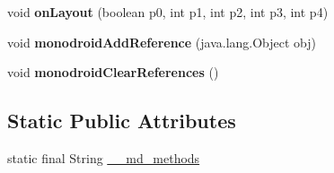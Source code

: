 \begin{DoxyCompactItemize}
\item 
\mbox{\label{classmd5b60ffeb829f638581ab2bb9b1a7f4f3f_1_1VisualElementRenderer__1_a8c7af843aeec04827cb3a3981ea1978d}} 
void {\bfseries on\+Layout} (boolean p0, int p1, int p2, int p3, int p4)
\item 
\mbox{\label{classmd5b60ffeb829f638581ab2bb9b1a7f4f3f_1_1VisualElementRenderer__1_a321b2967faff34b0f7971f55915f583e}} 
void {\bfseries monodroid\+Add\+Reference} (java.\+lang.\+Object obj)
\item 
\mbox{\label{classmd5b60ffeb829f638581ab2bb9b1a7f4f3f_1_1VisualElementRenderer__1_a4a1c180026d8eab71549e47b7de4b9b8}} 
void {\bfseries monodroid\+Clear\+References} ()
\end{DoxyCompactItemize}
\subsection*{Static Public Attributes}
\begin{DoxyCompactItemize}
\item 
static final String \hyperlink{classmd5b60ffeb829f638581ab2bb9b1a7f4f3f_1_1VisualElementRenderer__1_a4ef182bc984a4330ed789e1f0b0222d1}{\+\_\+\+\_\+md\+\_\+methods}
\end{DoxyCompactItemize}

